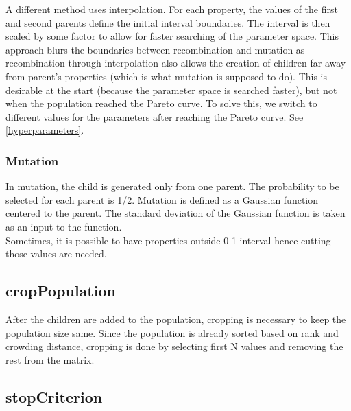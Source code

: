 A different method uses interpolation. For each property, the values of the first and second parents define the initial interval boundaries. The interval is then scaled by some factor to allow for faster searching of the parameter space. 
This approach blurs the boundaries between recombination and mutation as recombination through interpolation also allows the creation of children far away from parent's properties (which is what mutation is supposed to do). This is desirable at the start (because the parameter space is searched faster), but not when the population reached the Pareto curve. To solve this, we switch to different values for the parameters after reaching the Pareto curve. See \cref{hyperparameters}.

\subsubsection{Mutation}

In mutation, the child is generated only from one parent. The probability to be selected for each parent is 1/2. Mutation is defined as a Gaussian function centered to the parent. The standard deviation of the Gaussian function is taken as an input to the function.\\

Sometimes, it is possible to have properties outside 0-1 interval hence cutting those values are needed.

\subsection{cropPopulation} \label{cropPopulation}

After the children are added to the population, cropping is necessary to keep the population size same. Since the population is already sorted based on rank and crowding distance, cropping is done by selecting first N values and removing the rest from the matrix. 

\subsection{stopCriterion} \label{stopCriterion}

